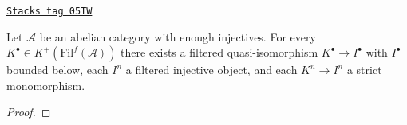\begin{lemma}
\label{derived-lemma-right-resolution-by-filtered-injectives}
\href{https://stacks.math.columbia.edu/tag/05TW}{\texttt{Stacks tag 05TW}}

Let $\mathcal{A}$ be an abelian category with enough injectives.
For every $K^\bullet \in K^{+}(\text{Fil}^f(\mathcal{A}))$
there exists a filtered quasi-isomorphism $K^\bullet \to I^\bullet$
with $I^\bullet$ bounded below,
each $I^n$ a filtered injective object, and
each $K^n \to I^n$ a strict monomorphism.
\end{lemma}

\begin{proof}


\end{proof}
